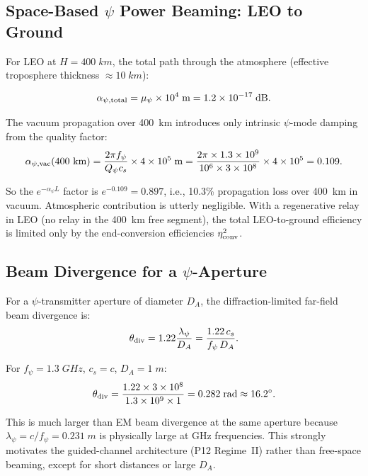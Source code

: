 \documentclass[aps,prd,twocolumn,superscriptaddress]{revtex4-2}
\begin{document}
\subsection{Space-Based $\psi$ Power Beaming: LEO to Ground}

For LEO at $H = 400\;\si{km}$, the total path through the atmosphere
(effective troposphere thickness $\approx 10\;\si{km}$):

\begin{equation}
\alpha_{\psi,\rm total} = \mu_\psi \times 10^4\;\si{m}
= 1.2\times10^{-17}\;\si{dB}.
\end{equation}

The vacuum propagation over 400~km introduces only intrinsic $\psi$-mode
damping from the quality factor:
\begin{equation}
\alpha_{\psi,\rm vac}(400~\text{km}) = \frac{2\pi f_\psi}{Q_\psi c_s}
\times 4\times10^5\;\si{m}
= \frac{2\pi\times1.3\times10^9}{10^6\times3\times10^8}
\times 4\times10^5 = 0.109.
\end{equation}

So the $e^{-\alpha_\psi L}$ factor is $e^{-0.109} = 0.897$, i.e.,
10.3\% propagation loss over 400~km in vacuum.  Atmospheric
contribution is utterly negligible.  With a regenerative relay
in LEO (no relay in the 400~km free segment), the total
LEO-to-ground efficiency is limited only by the end-conversion
efficiencies $\eta_{\rm conv}^2$.

\subsection{Beam Divergence for a $\psi$-Aperture}

For a $\psi$-transmitter aperture of diameter $D_A$, the
diffraction-limited far-field beam divergence is:
\begin{equation}
\theta_{\rm div} = 1.22\frac{\lambda_\psi}{D_A}
= \frac{1.22\,c_s}{f_\psi\,D_A}.
\label{eq:divergence}
\end{equation}

For $f_\psi = 1.3\;\si{GHz}$, $c_s = c$, $D_A = 1\;\si{m}$:
\begin{equation}
\theta_{\rm div} = \frac{1.22\times3\times10^8}{1.3\times10^9\times1}
= 0.282\;\si{rad} \approx 16.2^\circ.
\end{equation}

This is much larger than EM beam divergence at the same aperture because
$\lambda_\psi = c/f_\psi = 0.231\;\si{m}$ is physically large at GHz
frequencies.  This strongly motivates the guided-channel architecture
(P12 Regime~II) rather than free-space beaming, except for short
distances or large $D_A$.
\end{document}
